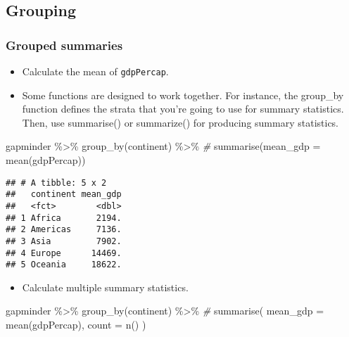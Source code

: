\documentclass[
]{book}
\newenvironment{Shaded}{\begin{snugshade}}{\end{snugshade}}
\newcommand{\AttributeTok}[1]{\textcolor[rgb]{0.77,0.63,0.00}{#1}}
\newcommand{\CommentTok}[1]{\textcolor[rgb]{0.56,0.35,0.01}{\textit{#1}}}
\newcommand{\FunctionTok}[1]{\textcolor[rgb]{0.00,0.00,0.00}{#1}}
\newcommand{\NormalTok}[1]{#1}
\newcommand{\SpecialCharTok}[1]{\textcolor[rgb]{0.00,0.00,0.00}{#1}}
\providecommand{\tightlist}{%
  \setlength{\itemsep}{0pt}\setlength{\parskip}{0pt}}
\begin{document}
\hypertarget{grouping}{%
\subsection{Grouping}\label{grouping}}

\hypertarget{grouped-summaries}{%
\subsubsection{Grouped summaries}\label{grouped-summaries}}

\begin{itemize}
\item
  Calculate the mean of \texttt{gdpPercap}.
\item
  Some functions are designed to work together. For instance, the group\_by
  function defines the strata that you're going to use for summary statistics. Then, use summarise() or summarize() for producing summary statistics.
\end{itemize}

\begin{Shaded}
\begin{Highlighting}[]
\NormalTok{gapminder }\SpecialCharTok{\%\textgreater{}\%}
  \FunctionTok{group\_by}\NormalTok{(continent) }\SpecialCharTok{\%\textgreater{}\%} \CommentTok{\#}
  \FunctionTok{summarise}\NormalTok{(}\AttributeTok{mean\_gdp =} \FunctionTok{mean}\NormalTok{(gdpPercap))}
\end{Highlighting}
\end{Shaded}

\begin{verbatim}
## # A tibble: 5 x 2
##   continent mean_gdp
##   <fct>        <dbl>
## 1 Africa       2194.
## 2 Americas     7136.
## 3 Asia         7902.
## 4 Europe      14469.
## 5 Oceania     18622.
\end{verbatim}

\begin{itemize}
\tightlist
\item
  Calculate multiple summary statistics.
\end{itemize}

\begin{Shaded}
\begin{Highlighting}[]
\NormalTok{gapminder }\SpecialCharTok{\%\textgreater{}\%}
  \FunctionTok{group\_by}\NormalTok{(continent) }\SpecialCharTok{\%\textgreater{}\%} \CommentTok{\#}
  \FunctionTok{summarise}\NormalTok{(}
    \AttributeTok{mean\_gdp =} \FunctionTok{mean}\NormalTok{(gdpPercap),}
    \AttributeTok{count =} \FunctionTok{n}\NormalTok{()}
\NormalTok{  )}
\end{Highlighting}
\end{Shaded}
\end{document}
